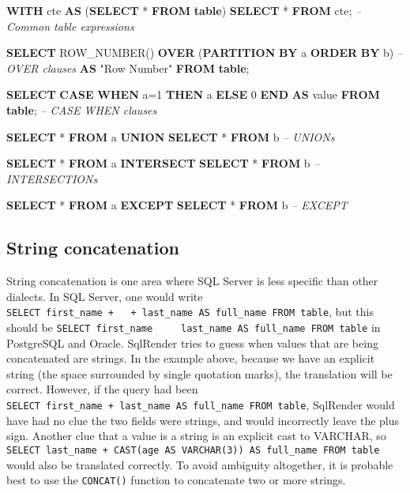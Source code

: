 \documentclass[]{article}
\newenvironment{Shaded}{\begin{snugshade}}{\end{snugshade}}
\newcommand{\CommentTok}[1]{\textcolor[rgb]{0.56,0.35,0.01}{\textit{#1}}}
\newcommand{\DecValTok}[1]{\textcolor[rgb]{0.00,0.00,0.81}{#1}}
\newcommand{\FunctionTok}[1]{\textcolor[rgb]{0.00,0.00,0.00}{#1}}
\newcommand{\KeywordTok}[1]{\textcolor[rgb]{0.13,0.29,0.53}{\textbf{#1}}}
\newcommand{\NormalTok}[1]{#1}
\newcommand{\OtherTok}[1]{\textcolor[rgb]{0.56,0.35,0.01}{#1}}
\begin{document}
\begin{Shaded}
\begin{Highlighting}[]
\KeywordTok{WITH}\NormalTok{ cte }\KeywordTok{AS}\NormalTok{ (}\KeywordTok{SELECT}\NormalTok{ * }\KeywordTok{FROM} \KeywordTok{table}\NormalTok{) }\KeywordTok{SELECT}\NormalTok{ * }\KeywordTok{FROM}\NormalTok{ cte;        }\CommentTok{-- Common table expressions}

\KeywordTok{SELECT} \FunctionTok{ROW_NUMBER}\NormalTok{() }\KeywordTok{OVER}\NormalTok{ (}\KeywordTok{PARTITION} \KeywordTok{BY}\NormalTok{ a }\KeywordTok{ORDER} \KeywordTok{BY}\NormalTok{ b)        }\CommentTok{-- OVER clauses}
  \KeywordTok{AS} \OtherTok{"Row Number"} \KeywordTok{FROM} \KeywordTok{table}\NormalTok{;}
  
\KeywordTok{SELECT} \KeywordTok{CASE} \KeywordTok{WHEN}\NormalTok{ a=}\DecValTok{1} \KeywordTok{THEN}\NormalTok{ a }\KeywordTok{ELSE} \DecValTok{0} \KeywordTok{END} \KeywordTok{AS} \FunctionTok{value} \KeywordTok{FROM} \KeywordTok{table}\NormalTok{; }\CommentTok{-- CASE WHEN clauses}

\KeywordTok{SELECT}\NormalTok{ * }\KeywordTok{FROM}\NormalTok{ a }\KeywordTok{UNION} \KeywordTok{SELECT}\NormalTok{ * }\KeywordTok{FROM}\NormalTok{ b                       }\CommentTok{-- UNIONs}

\KeywordTok{SELECT}\NormalTok{ * }\KeywordTok{FROM}\NormalTok{ a }\KeywordTok{INTERSECT} \KeywordTok{SELECT}\NormalTok{ * }\KeywordTok{FROM}\NormalTok{ b                   }\CommentTok{-- INTERSECTIONs}

\KeywordTok{SELECT}\NormalTok{ * }\KeywordTok{FROM}\NormalTok{ a }\KeywordTok{EXCEPT} \KeywordTok{SELECT}\NormalTok{ * }\KeywordTok{FROM}\NormalTok{ b                      }\CommentTok{-- EXCEPT}
\end{Highlighting}
\end{Shaded}

\hypertarget{string-concatenation}{%
\subsection{String concatenation}\label{string-concatenation}}

String concatenation is one area where SQL Server is less specific than
other dialects. In SQL Server, one would write
\texttt{SELECT\ first\_name\ +\ \textquotesingle{}\ \textquotesingle{}\ +\ last\_name\ AS\ full\_name\ FROM\ table},
but this should be
\texttt{SELECT\ first\_name\ \textbar{}\textbar{}\ \textquotesingle{}\ \textquotesingle{}\ \textbar{}\textbar{}\ last\_name\ AS\ full\_name\ FROM\ table}
in PostgreSQL and Oracle. SqlRender tries to guess when values that are
being concatenated are strings. In the example above, because we have an
explicit string (the space surrounded by single quotation marks), the
translation will be correct. However, if the query had been
\texttt{SELECT\ first\_name\ +\ last\_name\ AS\ full\_name\ FROM\ table},
SqlRender would have had no clue the two fields were strings, and would
incorrectly leave the plus sign. Another clue that a value is a string
is an explicit cast to VARCHAR, so
\texttt{SELECT\ last\_name\ +\ CAST(age\ AS\ VARCHAR(3))\ AS\ full\_name\ FROM\ table}
would also be translated correctly. To avoid ambiguity altogether, it is
probable best to use the \texttt{CONCAT()} function to concatenate two
or more strings.
\end{document}
